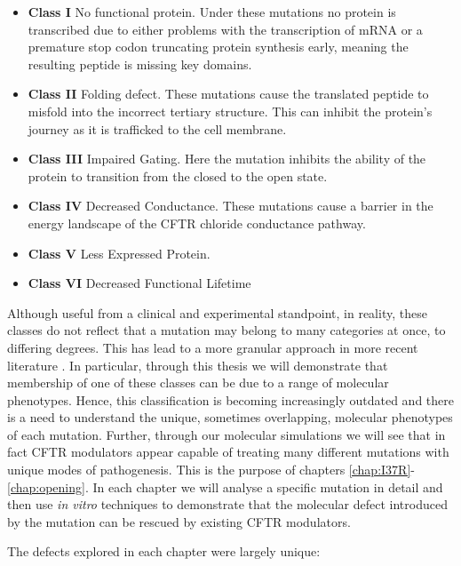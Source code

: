 \begin{itemize}

	\item \textbf{Class I} No functional protein. Under these mutations no protein is transcribed due to either problems with the transcription of mRNA or a premature stop codon truncating protein synthesis early, meaning the resulting peptide is missing key domains. 
	\item \textbf{Class II} Folding defect. These mutations cause the translated peptide to misfold into the incorrect tertiary structure. This can inhibit the protein's journey as it is trafficked to the cell membrane. 
	\item \textbf{Class III} Impaired Gating. Here the mutation inhibits the ability of the protein to transition from the closed to the open state. 
	\item \textbf{Class IV} Decreased Conductance. These mutations cause a barrier in the energy landscape of the CFTR chloride conductance pathway.
	\item \textbf{Class V} Less Expressed Protein.  
	\item \textbf{Class VI} Decreased Functional Lifetime

\end{itemize}

Although useful from a clinical and experimental standpoint, in reality, these classes do not reflect that a mutation may belong to many categories at once, to differing degrees. This has lead to a more granular approach in more recent literature \cite{veit2016}. In particular, through this thesis we will demonstrate that membership of one of these classes can be due to a range of molecular phenotypes. Hence, this classification is becoming increasingly outdated and there is a need to understand the unique, sometimes overlapping, molecular phenotypes of each mutation. Further, through our molecular simulations we will see that in fact CFTR modulators appear capable of treating many different mutations with unique modes of pathogenesis. This is the purpose of chapters \ref{chap:I37R}-\ref{chap:opening}. In each chapter we will analyse a specific mutation in detail and then use \textit {in vitro} techniques to demonstrate that the molecular defect introduced by the mutation can be rescued by existing CFTR modulators. 

The defects explored in each chapter were largely unique: 

